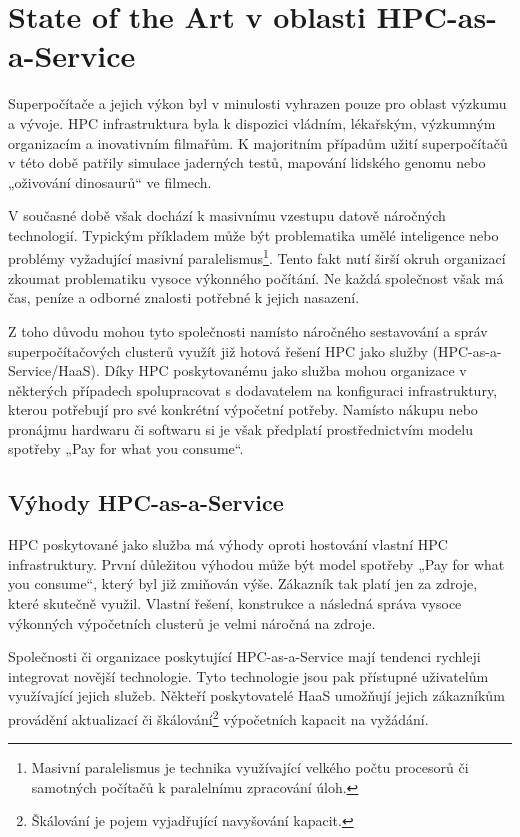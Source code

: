 \chapter{State of the Art v oblasti HPC-as-a-Service}
Superpočítače a jejich výkon byl v minulosti vyhrazen pouze pro oblast výzkumu a vývoje. HPC infrastruktura byla k dispozici vládním, lékařským, výzkumným organizacím a inovativním filmařům. K majoritním případům užití superpočítačů v této době patřily simulace jaderných testů, mapování lidského genomu nebo „oživování dinosaurů“ ve filmech.

V současné době však dochází k masivnímu vzestupu datově náročných technologií. Typickým příkladem může být problematika umělé inteligence nebo problémy vyžadující masivní paralelismus\footnote{Masivní paralelismus je technika využívající velkého počtu procesorů či samotných počítačů k paralelnímu zpracování úloh.}. Tento fakt nutí širší okruh organizací zkoumat problematiku vysoce výkonného počítání. Ne každá společnost však má čas, peníze a odborné znalosti potřebné k jejich nasazení.

Z toho důvodu mohou tyto společnosti namísto náročného sestavování a správ superpočítačových clusterů využít již hotová řešení HPC jako služby (HPC-as-a-Service/HaaS). Díky HPC poskytovanému jako služba mohou organizace v některých případech spolupracovat s dodavatelem na konfiguraci infrastruktury, kterou potřebují pro své konkrétní výpočetní potřeby. Namísto nákupu nebo pronájmu hardwaru či softwaru si je však předplatí prostřednictvím modelu spotřeby „Pay for what you consume“.\cite{Rand20201203}

\section{Výhody HPC-as-a-Service}
HPC poskytované jako služba má výhody oproti hostování vlastní HPC infrastruktury. První důležitou výhodou může být model spotřeby „Pay for what you consume“, který byl již zmiňován výše. Zákazník tak platí jen za zdroje, které skutečně využil. Vlastní řešení, konstrukce a následná správa vysoce výkonných výpočetních clusterů je velmi náročná na zdroje.

Společnosti či organizace poskytující HPC-as-a-Service mají tendenci rychleji integrovat novější technologie. Tyto technologie jsou pak přístupné uživatelům využívající jejich služeb. Někteří poskytovatelé HaaS umožňují jejich zákazníkům provádění aktualizací či škálování\footnote{Škálování je pojem vyjadřující navyšování kapacit.} výpočetních kapacit na vyžádání. \cite{Wiggers20220120}

